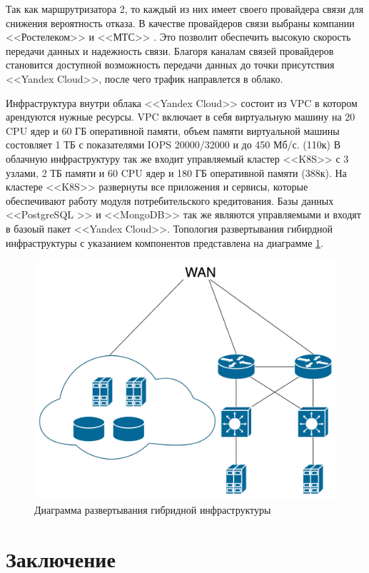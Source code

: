 \documentclass[14pt, a4paper]{extarticle}
\begin{document}
Так как маршрутризатора 2, то каждый из них имеет своего провайдера связи для 
снижения вероятность отказа. В качестве провайдеров связи выбраны компании <<Ростелеком>> 
\cite{rostelekom} и <<МТС>> \cite{mts}. Это позволит 
обеспечить высокую скорость передачи данных и надежность связи. Благоря каналам 
связей провайдеров  становится доступной возможность передачи данных до точки присутствия 
<<Yandex Cloud>>, после чего трафик направлется в облако.

Инфраструктура внутри облака <<Yandex Cloud>> состоит из VPC в котором арендуются 
нужные ресурсы. VPC включает в себя виртуальную машину на 20 CPU ядер и 60 ГБ оперативной
памяти, объем памяти виртуальной машины состовляет 1 ТБ с показателями IOPS 20000/32000 и
до 450 Мб/с. (110к) В облачную инфраструктуру так же входит управляемый кластер <<K8S>>
\cite{k8s} с 3 узлами, 2 ТБ памяти и 60 CPU ядер и 180 ГБ оперативной памяти (388к). На кластере 
<<K8S>> развернуты все приложения и сервисы, которые обеспечивают работу модуля
потребительского кредитования. Базы данных <<PostgreSQL >> \cite{postgresql} и 
<<MongoDB>> \cite{mongodb} так же являются управляемыми и входят в базоый пакет
<<Yandex Cloud>>. Топология развертывания гибирдной инфраструктуры с указанием 
компонентов представлена на диаграмме \ref{fig:components-structure}.

\begin{figure}[H]
  \centering
  \includegraphics[width=1\textwidth]{components-structure.png}
  \caption{Диаграмма развертывания гибридной инфраструктуры}
  \label{fig:components-structure}
\end{figure}


\section{Заключение}


\begingroup
\let\itshape\upshape
\sloppy
\raggedright
\printbibliography[title=СПИСОК ИСПОЛЬЗУЕМЫХ ИСТОЧНИКОВ]
{}
\endgroup
\end{document}
